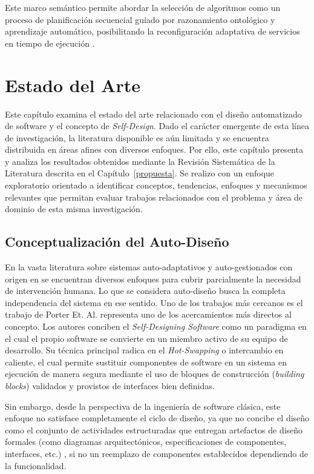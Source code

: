 \documentclass[12pt, letterpaper, oneside]{book}
\begin{document}
Este marco semántico permite abordar la selección de algoritmos como un proceso de planificación secuencial guiado por razonamiento ontológico y aprendizaje automático, posibilitando la reconfiguración adaptativa de servicios en tiempo de ejecución \cite{duran2026seleccion}.


\chapter{Estado del Arte}\label{arte}

Este capítulo examina el estado del arte relacionado con el diseño automatizado de software y el concepto de \textit{Self-Design}. Dado el carácter emergente de esta línea de investigación, la literatura disponible es aún limitada y se encuentra distribuida en áreas afines con diversos enfoques. Por ello, este capítulo presenta y analiza los resultados obtenidos mediante la Revisión Sistemática de la Literatura descrita en el Capítulo~\ref{propuesta}. Se realizo con un enfoque exploratorio orientado a identificar conceptos, tendencias, enfoques y mecanismos relevantes que permitan evaluar trabajos relacionados con el problema y área de dominio de esta misma investigación.

\section{Conceptualización del Auto-Diseño}

En la vasta literatura sobre sistemas auto-adaptativos y auto-gestionados con origen en  \cite{ibm2001autonomic,kephart2003vision,ibm2006autonomic} se encuentran diversos enfoques para cubrir parcialmente la necesidad de intervención humana. Lo que se considera auto-diseño busca la completa independencia del sistema en ese sentido. Uno de los trabajos más cercanos es el trabajo de Porter Et. Al. \cite{Porter2024SelfDesigning} representa uno de los acercamientos más directos al concepto. Los autores conciben el \textit{Self-Designing Software} como un paradigma en el cual el propio software se convierte en un miembro activo de su equipo de desarrollo. Su técnica principal radica en el \textit{Hot-Swapping} o intercambio en caliente, el cual permite sustituir componentes de software en un sistema en ejecución de manera segura mediante el uso de bloques de construcción (\textit{building blocks}) validados y provistos de interfaces bien definidas.

Sin embargo, desde la perspectiva de la ingeniería de software clásica, este enfoque no satisface completamente el ciclo de diseño, ya que no concibe el diseño como el conjunto de actividades estructuradas que entregan artefactos de diseño formales (como diagramas arquitectónicos, especificaciones de componentes, interfaces, etc.) \cite{sommerville2011software}, si no un reemplazo de componentes establecidos dependiendo de la funcionalidad.
\end{document}

